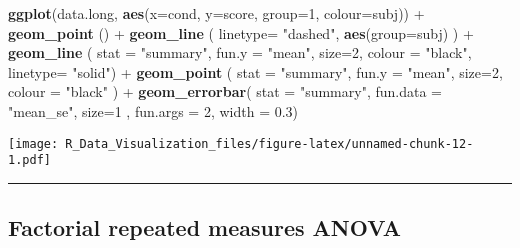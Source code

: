 \documentclass[]{article}
\newenvironment{Shaded}{\begin{snugshade}}{\end{snugshade}}
\newcommand{\KeywordTok}[1]{\textcolor[rgb]{0.13,0.29,0.53}{\textbf{{#1}}}}
\newcommand{\DataTypeTok}[1]{\textcolor[rgb]{0.13,0.29,0.53}{{#1}}}
\newcommand{\DecValTok}[1]{\textcolor[rgb]{0.00,0.00,0.81}{{#1}}}
\newcommand{\FloatTok}[1]{\textcolor[rgb]{0.00,0.00,0.81}{{#1}}}
\newcommand{\StringTok}[1]{\textcolor[rgb]{0.31,0.60,0.02}{{#1}}}
\newcommand{\NormalTok}[1]{{#1}}
\begin{document}
\begin{Shaded}
\begin{Highlighting}[]
\KeywordTok{ggplot}\NormalTok{(data.long, }\KeywordTok{aes}\NormalTok{(}\DataTypeTok{x=}\NormalTok{cond, }\DataTypeTok{y=}\NormalTok{score, }\DataTypeTok{group=}\DecValTok{1}\NormalTok{, }\DataTypeTok{colour=}\NormalTok{subj)) +}\StringTok{ }
\StringTok{  }\KeywordTok{geom_point}   \NormalTok{() +}
\StringTok{  }\KeywordTok{geom_line}    \NormalTok{( }\DataTypeTok{linetype=} \StringTok{"dashed"}\NormalTok{, }\KeywordTok{aes}\NormalTok{(}\DataTypeTok{group=}\NormalTok{subj) ) +}
\StringTok{  }\KeywordTok{geom_line}    \NormalTok{( }\DataTypeTok{stat =} \StringTok{"summary"}\NormalTok{, }\DataTypeTok{fun.y    =} \StringTok{"mean"}\NormalTok{,    }\DataTypeTok{size=}\DecValTok{2}\NormalTok{, }\DataTypeTok{colour =} \StringTok{"black"}\NormalTok{, }\DataTypeTok{linetype=} \StringTok{"solid"}\NormalTok{) +}
\StringTok{  }\KeywordTok{geom_point}   \NormalTok{( }\DataTypeTok{stat =} \StringTok{"summary"}\NormalTok{, }\DataTypeTok{fun.y    =} \StringTok{"mean"}\NormalTok{,    }\DataTypeTok{size=}\DecValTok{2}\NormalTok{, }\DataTypeTok{colour =} \StringTok{"black"} \NormalTok{) +}
\StringTok{  }\KeywordTok{geom_errorbar}\NormalTok{( }\DataTypeTok{stat =} \StringTok{"summary"}\NormalTok{, }\DataTypeTok{fun.data =} \StringTok{"mean_se"}\NormalTok{, }\DataTypeTok{size=}\DecValTok{1} \NormalTok{, }\DataTypeTok{fun.args =} \DecValTok{2}\NormalTok{, }\DataTypeTok{width =} \FloatTok{0.3}\NormalTok{)}
\end{Highlighting}
\end{Shaded}

\texttt{[image: R\_Data\_Visualization\_files/figure-latex/unnamed-chunk-12-1.pdf]}

\begin{center}\rule{0.5\linewidth}{\linethickness}\end{center}

\newpage

\subsection{Factorial repeated measures
ANOVA}\label{factorial-repeated-measures-anova}
\end{document}
